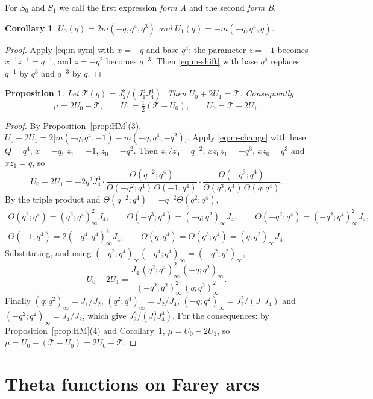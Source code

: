 \documentclass[11pt]{amsart}
\newtheorem{proposition}[theorem]{Proposition}
\newtheorem{corollary}[theorem]{Corollary}
\theoremstyle{definition}
\theoremstyle{remark}
\numberwithin{equation}{section}
\newcommand{\THq}{\mathcal{T}}
\begin{document}
For $S_0$ and $S_1$ we call the first expression \emph{form A} and the second \emph{form B}.

\begin{corollary}\label{cor:U}
$U_0(q)=2m(-q,q^4,q^3)$ and $U_1(q)=-m(-q,q^4,q)$.
\end{corollary}

\begin{proof}
Apply \eqref{eq:m-sym} with $x=-q$ and base $q^4$: the parameter $z=-1$ becomes $x^{-1}z^{-1}=q^{-1}$, and $z=-q^2$ becomes $q^{-3}$.
Then \eqref{eq:m-shift} with base $q^4$ replaces $q^{-1}$ by $q^3$ and $q^{-3}$ by $q$.
\end{proof}

\begin{proposition}\label{prop:TH}
Let $\THq(q)=J_2^8/(J_1^3J_4^4)$.
Then $U_0+2U_1=\THq$.
Consequently
\[
\mu=2U_0-\THq,\qquad U_1=\tfrac12(\THq-U_0),\qquad U_0=\THq-2U_1.
\]
\end{proposition}

\begin{proof}
By Proposition~\ref{prop:HM}(3), $U_0+2U_1=2\big[m(-q,q^4,-1)-m(-q,q^4,-q^2)\big]$.
Apply \eqref{eq:m-change} with base $Q=q^4$, $x=-q$, $z_1=-1$, $z_0=-q^2$.
Then $z_1/z_0=q^{-2}$, $xz_0z_1=-q^3$, $xz_0=q^3$ and $xz_1=q$, so
\[
U_0+2U_1=-2q^2J_4^3\cdot\frac{\Theta(q^{-2};q^4)}{\Theta(-q^2;q^4)\,\Theta(-1;q^4)}\cdot\frac{\Theta(-q^3;q^4)}{\Theta(q^3;q^4)\,\Theta(q;q^4)}.
\]
By the triple product and $\Theta(q^{-2};q^4)=-q^{-2}\Theta(q^2;q^4)$,
\begin{gather*}
\Theta(q^2;q^4)=(q^2;q^4)_\infty^2J_4,\qquad \Theta(-q^3;q^4)=(-q;q^2)_\infty J_4,\qquad \Theta(-q^2;q^4)=(-q^2;q^4)_\infty^2J_4,\\
\Theta(-1;q^4)=2(-q^4;q^4)_\infty^2J_4,\qquad \Theta(q;q^4)=\Theta(q^3;q^4)=(q;q^2)_\infty J_4.
\end{gather*}
Substituting, and using $(-q^2;q^4)_\infty(-q^4;q^4)_\infty=(-q^2;q^2)_\infty$,
\[
U_0+2U_1=\frac{J_4\,(q^2;q^4)_\infty^2\,(-q;q^2)_\infty}{(-q^2;q^2)_\infty^2\,(q;q^2)_\infty^2}.
\]
Finally $(q;q^2)_\infty=J_1/J_2$, $(q^2;q^4)_\infty=J_2/J_4$, $(-q;q^2)_\infty=J_2^2/(J_1J_4)$ and $(-q^2;q^2)_\infty=J_4/J_2$, which give $J_2^8/(J_1^3J_4^4)$.
For the consequences: by Proposition~\ref{prop:HM}(4) and Corollary~\ref{cor:U}, $\mu=U_0-2U_1$, so $\mu=U_0-(\THq-U_0)=2U_0-\THq$.
\end{proof}

\section{Theta functions on Farey arcs}\label{sec:theta}
\end{document}
